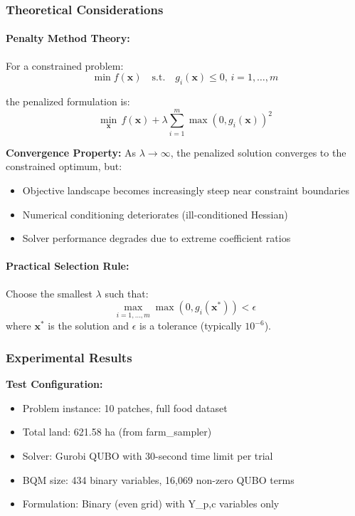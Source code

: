 \documentclass{article}
\begin{document}
\subsubsection{Theoretical Considerations}

\paragraph{Penalty Method Theory:} For a constrained problem:
$$\min f(\mathbf{x}) \quad \text{s.t.} \quad g_i(\mathbf{x}) \leq 0, \, i=1,\ldots,m$$

the penalized formulation is:
$$\min_{\mathbf{x}} \, f(\mathbf{x}) + \lambda \sum_{i=1}^m \max(0, g_i(\mathbf{x}))^2$$

\textbf{Convergence Property:} As $\lambda \to \infty$, the penalized solution converges to the constrained optimum, but:
\begin{itemize}
    \item Objective landscape becomes increasingly steep near constraint boundaries
    \item Numerical conditioning deteriorates (ill-conditioned Hessian)
    \item Solver performance degrades due to extreme coefficient ratios
\end{itemize}

\paragraph{Practical Selection Rule:} Choose the smallest $\lambda$ such that:
$$\max_{i=1,\ldots,m} \max(0, g_i(\mathbf{x}^*)) < \epsilon$$
where $\mathbf{x}^*$ is the solution and $\epsilon$ is a tolerance (typically $10^{-6}$).

\subsubsection{Experimental Results}

\textbf{Test Configuration:}
\begin{itemize}
    \item Problem instance: 10 patches, full food dataset
    \item Total land: 621.58 ha (from farm\_sampler)
    \item Solver: Gurobi QUBO with 30-second time limit per trial
    \item BQM size: 434 binary variables, 16,069 non-zero QUBO terms
    \item Formulation: Binary (even grid) with Y\_{p,c} variables only
\end{itemize}
\end{document}
